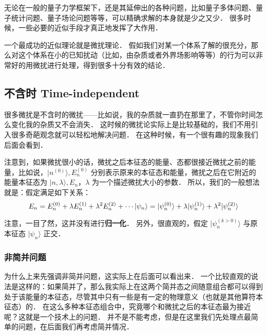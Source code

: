 
\begin{issues}
\issueMissDepend
\end{issues}

无论在一般的量子力学框架下，还是其延伸出的各种问题，比如量子多体问题、量子统计问题、量子场论问题等等，可以精确求解的本身就是少之又少． 很多时候，一些必要的近似手段才真正地发挥了大作用．

一个最成功的近似理论就是微扰理论． 假如我们对某一个体系了解的很充分，那么对这个体系在小的已知扰动（比如，由杂质或者外界场影响等等）的行为可以非常好的用微扰进行处理，得到很多十分有效的结论．

\subsection{不含时 Time-independent}

很多微扰是不含时的微扰——比如说，我的杂质就一直扔在那里了，不管你时间怎么变化我的杂质又不会消失． 这时候的微扰论实际上是比较基础的，我们不用引入很多奇葩观念就可以轻松地解决问题． 在这种时候，有一个很有趣的现象我们后面会看到．

注意到，如果微扰很小的话，微扰之后本征态的能量、态都很接近微扰之前的能量，比如说，$|n^{(0)}\rangle, E_n^{(0)}$ 分别表示原来的本征态和能量，微扰之后在它附近的能量本征态为 $|n,\lambda\rangle, E_n$，$\lambda$ 为一个描述微扰大小的参数． 所以，我们的一般想法就是：假定满足如下关系：
\begin{equation}
E_n = E_n^{(0)} + \lambda E_n^{(1)} + \lambda^2 E_n^{(2)} + \cdots\\
|\psi_n\rangle = |\psi_n^{(0)}\rangle + \lambda|\psi_n^{(1)}\rangle + \lambda^2 |\psi_n^{(2)}\rangle
\end{equation}

注意，一目了然，这并没有进行\textbf{归一化}． 另外，很直观的，假定 $|\psi_n^{(k>0)}\rangle$ 与原本征态 $|\psi_n\rangle$ 正交．

\subsubsection{非简并问题}

为什么上来先强调非简并问题，这实际上在后面可以看出来． 一个比较直观的说法是这样的：如果简并了，那么我实际上在这两个简并态之间随意组合都可以得到处于该能量的本征态，尽管其中只有一些是有一定的物理意义（也就是其他算符本征态）的． 在这么多种本征态组合中，究竟哪个和微扰之后的本征态最为接近呢？这就是一个技术上的问题． 并不是不能考虑，但是在这里我们先处理点最简单的问题，在后面我们再考虑简并情况．

